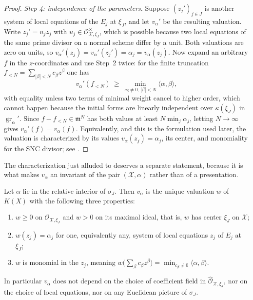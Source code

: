 \begin{proof}
\emph{Step 4: independence of the parameters.} Suppose $(z_j')_{j\in J}$
is another system of local equations of the $E_j$ at $\xi_J$, and let
$v_\alpha'$ be the resulting valuation. Write $z_j'=u_jz_j$ with
$u_j\in\mathcal O_{\mathcal X,\xi_J}^\times$, which is possible because
two local equations of the same prime divisor on a normal scheme differ by
a unit. Both valuations are zero on units, so
$v_\alpha'(z_j)=v_\alpha'(z_j')=\alpha_j=v_\alpha(z_j)$. Now expand an
arbitrary $f$ in the $z$-coordinates and use Step~2 twice: for the
finite truncation $f_{<N}=\sum_{|\beta|<N}c_\beta z^\beta$ one has
\[
  v_\alpha'(f_{<N})
  \ \ge\ \min_{c_\beta\neq0,\,|\beta|<N}\langle\alpha,\beta\rangle,
\]
with equality unless two terms of minimal weight cancel to higher order,
which cannot happen because the initial forms are linearly independent over
$\kappa(\xi_J)$ in $\operatorname{gr}_{\alpha}'$. Since
$f-f_{<N}\in\mathfrak m^N$ has both values at least $N\min_j\alpha_j$,
letting $N\to\infty$ gives $v_\alpha'(f)=v_\alpha(f)$. Equivalently,
and this is the formulation used later, the valuation is characterized by
its values $v_\alpha(z_j)=\alpha_j$, its center, and monomiality for the
SNC divisor; see .
\end{proof}

The characterization just alluded to deserves a separate statement, because
it is what makes $v_\alpha$ an invariant of the pair
$(\mathcal X,\alpha)$ rather than of a presentation.

\begin{lemma}
\label{lem:monomial-uniqueness}
Let $\alpha$ lie in the relative interior of $\sigma_J$. Then
$v_\alpha$ is the unique valuation $w$ of $K(X)$ with the following
three properties:
\begin{enumerate}
\item $w\ge0$ on $\mathcal O_{\mathcal X,\xi_J}$ and $w>0$ on its
  maximal ideal, that is, $w$ has center $\xi_J$ on $\mathcal X$;
\item $w(z_j)=\alpha_j$ for one, equivalently any, system of local
  equations $z_j$ of $E_j$ at $\xi_J$;
\item $w$ is monomial in the $z_j$, meaning
  $w\bigl(\sum_\beta c_\beta z^\beta\bigr)
    =\min_{c_\beta\neq0}\langle\alpha,\beta\rangle$.
\end{enumerate}
In particular $v_\alpha$ does not depend on the choice of coefficient
field in $\widehat{\mathcal O}_{\mathcal X,\xi_J}$, nor on the choice of
local equations, nor on any Euclidean picture of $\sigma_J$.
\end{lemma}

